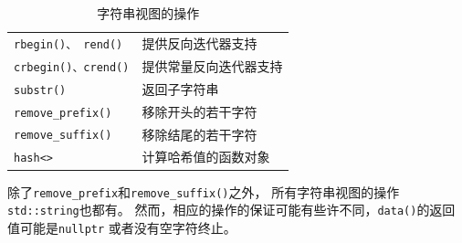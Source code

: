 \begin{table}[ht]
\begin{tabular}{l|p{}}
        \texttt{rbegin()、 rend()}          & 提供反向迭代器支持                          \\
        \texttt{crbegin()、crend()}         & 提供常量反向迭代器支持                        \\
        \texttt{substr()}                  & 返回子字符串                             \\
        \texttt{remove\_prefix()}          & 移除开头的若干字符                          \\
        \texttt{remove\_suffix()}          & 移除结尾的若干字符                          \\
        \texttt{hash<>}                    & 计算哈希值的函数对象                         \\
        \hline
    \end{tabular}
    \caption{字符串视图的操作}
    \label{t19.1}
\end{table}

除了\texttt{remove\_prefix}和\texttt{remove\_suffix()}之外，
所有字符串视图的操作\texttt{std::string}也都有。
然而，相应的操作的保证可能有些许不同，\texttt{data()}的返回值可能是\texttt{nullptr}
或者没有空字符终止。

